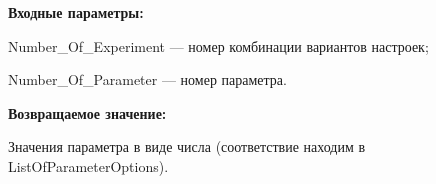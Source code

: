 \textbf{Входные параметры:}

Number\_Of\_Experiment --- номер комбинации вариантов настроек;
 
    Number\_Of\_Parameter --- номер параметра.

\textbf{Возвращаемое значение:}

Значения параметра в виде числа (соответствие находим в ListOfParameterOptions).